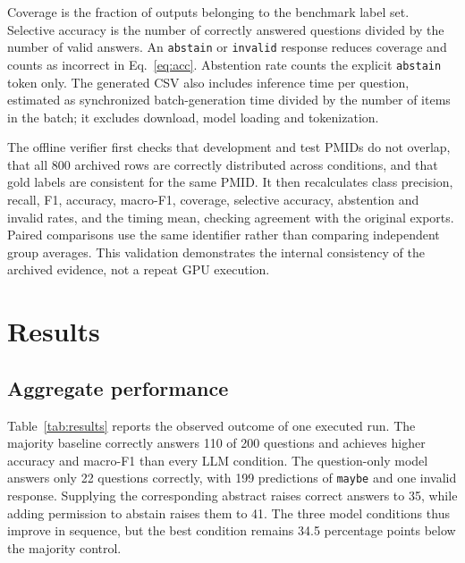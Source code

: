 \documentclass[conference]{IEEEtran}
\begin{document}
Coverage is the fraction of outputs belonging to the benchmark label set. Selective accuracy is the number of correctly answered questions divided by the number of valid answers. An \texttt{abstain} or \texttt{invalid} response reduces coverage and counts as incorrect in Eq.~\eqref{eq:acc}. Abstention rate counts the explicit \texttt{abstain} token only. The generated CSV also includes inference time per question, estimated as synchronized batch-generation time divided by the number of items in the batch; it excludes download, model loading and tokenization.

The offline verifier first checks that development and test PMIDs do not overlap, that all 800 archived rows are correctly distributed across conditions, and that gold labels are consistent for the same PMID. It then recalculates class precision, recall, F1, accuracy, macro-F1, coverage, selective accuracy, abstention and invalid rates, and the timing mean, checking agreement with the original exports. Paired comparisons use the same identifier rather than comparing independent group averages. This validation demonstrates the internal consistency of the archived evidence, not a repeat GPU execution.

\section{Results}
\subsection{Aggregate performance}
Table~\ref{tab:results} reports the observed outcome of one executed run. The majority baseline correctly answers 110 of 200 questions and achieves higher accuracy and macro-F1 than every LLM condition. The question-only model answers only 22 questions correctly, with 199 predictions of \texttt{maybe} and one invalid response. Supplying the corresponding abstract raises correct answers to 35, while adding permission to abstain raises them to 41. The three model conditions thus improve in sequence, but the best condition remains 34.5 percentage points below the majority control.

\begin{table}[t]
\centering
\caption{Results from the same 200 archived test examples.}
\label{tab:results}
\end{table}
\end{document}
